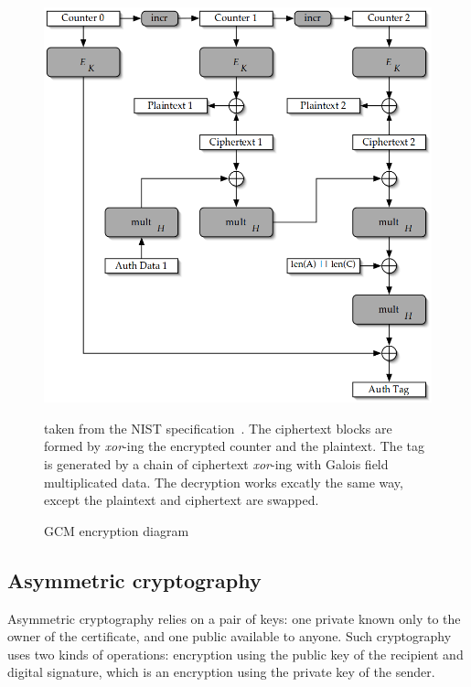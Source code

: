 \begin{figure}
\includegraphics[width=\textwidth]{nist-gcm-encrypt}
\caption{GCM encryption diagram}{taken from the NIST specification~\cite{mcgrew2005}. The ciphertext blocks are formed by \textit{xor}-ing the encrypted counter and the plaintext. The tag is generated by a chain of ciphertext \textit{xor}-ing with Galois field multiplicated data. The decryption works excatly the same way, except the plaintext and ciphertext are swapped.}
\label{fig:gcm-encrypt}
\end{figure}




\subsection{Asymmetric cryptography}
Asymmetric cryptography relies on a pair of keys: one private known only to the owner of the certificate, and one public available to anyone.
Such cryptography uses two kinds of operations: encryption using the public key of the recipient and digital signature, which is an encryption using the private key of the sender.

